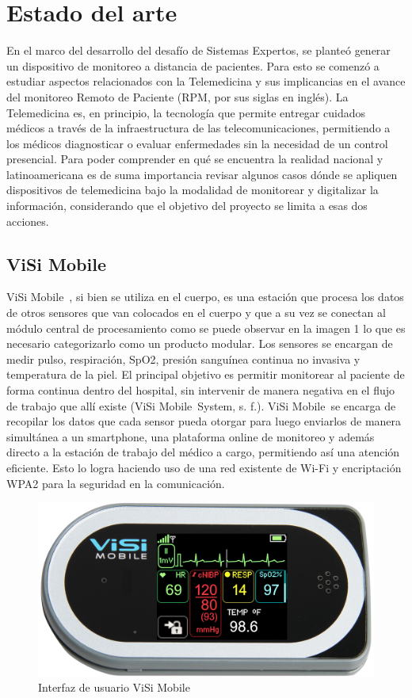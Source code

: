 \chapter{Estado del arte}\label{arte}
En el marco del desarrollo del desafío de Sistemas Expertos, se planteó generar un dispositivo de monitoreo a distancia de pacientes. Para esto se comenzó a estudiar aspectos relacionados con la Telemedicina y sus implicancias en el avance del monitoreo Remoto de Paciente (RPM, por sus siglas en inglés). La Telemedicina es, en principio, la tecnología que permite entregar cuidados médicos a través de la infraestructura de las telecomunicaciones, permitiendo a los médicos diagnosticar o evaluar enfermedades sin la necesidad de un control presencial.
Para poder comprender en qué se encuentra la realidad nacional y latinoamericana es de suma importancia revisar algunos casos dónde se apliquen dispositivos de telemedicina bajo la modalidad de monitorear y digitalizar la información, considerando que el objetivo del proyecto se limita a esas dos acciones.

\section{ViSi Mobile\textregistered}
ViSi Mobile\textregistered\ \cite{visi}, si bien se utiliza en el cuerpo, es una estación que procesa los datos de otros sensores que van colocados en el cuerpo y que a su vez se conectan al módulo central de procesamiento como se puede observar en la imagen 1 lo que es necesario categorizarlo como un producto modular. Los sensores se encargan de medir pulso, respiración, SpO2, presión sanguínea continua no invasiva y temperatura de la piel. El principal objetivo es permitir monitorear al paciente de forma  continua dentro del hospital, sin intervenir de manera negativa en el flujo de trabajo que allí existe (ViSi Mobile\textregistered\ System, s. f.). ViSi Mobile\textregistered\ se encarga de recopilar los datos que cada sensor pueda otorgar para luego enviarlos de manera simultánea a un smartphone, una plataforma online de monitoreo y además directo a la estación de trabajo del médico a cargo, permitiendo así una atención eficiente. Esto lo logra haciendo uso de una red existente de Wi-Fi y encriptación WPA2 para la seguridad en la comunicación\cite{visi_tel}.

\begin{figure}[H]
	\centering
	\includegraphics[scale=0.3]{figuras/estadoarte/visi/visi.jpg}
	\caption{Interfaz de usuario ViSi Mobile\textregistered}
	\label{visi1}
\end{figure}

